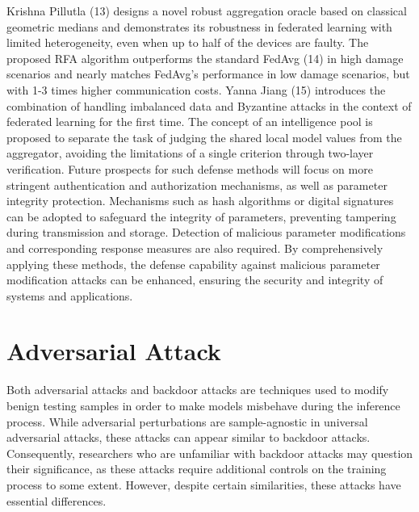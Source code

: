 \documentclass[conference]{IEEEtran}
\begin{document}
Krishna Pillutla (13) designs a novel robust aggregation oracle based on classical geometric medians and demonstrates its robustness in federated learning with limited heterogeneity, even when up to half of the devices are faulty. The proposed RFA algorithm outperforms the standard FedAvg (14) in high damage scenarios and nearly matches FedAvg's performance in low damage scenarios, but with 1-3 times higher communication costs.
Yanna Jiang (15) introduces the combination of handling imbalanced data and Byzantine attacks in the context of federated learning for the first time. The concept of an intelligence pool is proposed to separate the task of judging the shared local model values from the aggregator, avoiding the limitations of a single criterion through two-layer verification.
Future prospects for such defense methods will focus on more stringent authentication and authorization mechanisms, as well as parameter integrity protection. Mechanisms such as hash algorithms or digital signatures can be adopted to safeguard the integrity of parameters, preventing tampering during transmission and storage. Detection of malicious parameter modifications and corresponding response measures are also required. By comprehensively applying these methods, the defense capability against malicious parameter modification attacks can be enhanced, ensuring the security and integrity of systems and applications.

\section{Adversarial Attack}
Both adversarial attacks and backdoor attacks are techniques used to modify benign testing samples
in order to make models misbehave during the inference process. While adversarial perturbations are sample-agnostic in universal adversarial attacks,
these attacks can appear similar to backdoor attacks. Consequently, researchers who are unfamiliar with backdoor attacks may question their significance,
as these attacks require additional controls on the training process to some extent.
However, despite certain similarities, these attacks have essential differences.
\end{document}
